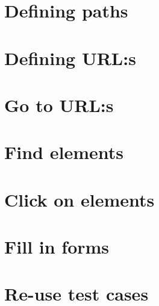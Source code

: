 \documentclass[a4paper,11pt]{kth-mag}
\begin{document}
\section{Defining paths}

\section{Defining URL:s}

\section{Go to URL:s}



\section{Find elements}




\section{Click on elements}


\section{Fill in forms}







\section{Re-use test cases}
\end{document}
